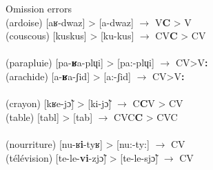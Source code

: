 \documentclass[output=paper,newtxmath,modfonts,nonflat,draftmode]{langsci/langscibook}
\begin{document}

\ea Omission errors \label{ex:takam:omission_errors}
\ea{}\\
(ardoise) [aʁ-dwaz] > [a-dwaz] $\rightarrow$ V\textbf{C} > V\\
(couscous) [kuskus] > [ku-kus] $\rightarrow$ CV\textbf{C} > CV\\

\ex{}\\
(parapluie) [pa-\textbf{ʁ}a-plɥi] > [pa:-plɥi] $\rightarrow$ CV>V\textbf{:}\\
(arachide) [a-\textbf{ʁ}a-ʃid] >  [a:-ʃid] $\rightarrow$ CV>V\textbf{:}\\

\ex{}\\
(crayon) [kʁe-jɔ̃] > [ki-jɔ̃] $\rightarrow$ C\textbf{C}V > CV\\
(table)  [tabl] > [tab] $\rightarrow$ CVC\textbf{C} > CVC\\
\pagebreak
\ex{}\\
(nourriture) [nu-ʁ\textbf{i}-tyʁ] > [nu:-ty:] $\rightarrow$ CV\\
(télévision) [te-le-\textbf{vi}-zjɔ̃] > [te-le-sjɔ̃] $\rightarrow$ CV\\
\end{document}
